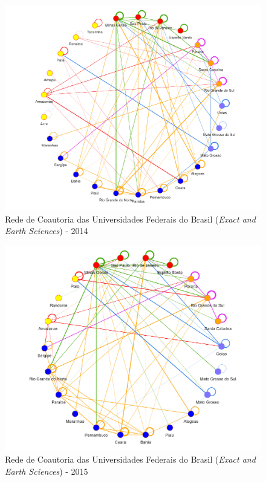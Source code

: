 \begin{figure}[H]
	\centering
	\includegraphics[scale=0.6]{Imagens/rede-exact-br-2014.pdf}
	\caption{Rede de Coautoria das Universidades Federais do Brasil (\textit{Exact and Earth Sciences}) - 2014}
	\label{Rede de Coautoria - UF EXACT BR 2014}
\end{figure}


\begin{figure}[H]
	\centering
	\includegraphics[scale=0.6]{Imagens/rede-exact-br-2015.pdf}
	\caption{Rede de Coautoria das Universidades Federais do Brasil (\textit{Exact and Earth Sciences}) - 2015}
	\label{Rede de Coautoria - UF EXACT BR 2015}
\end{figure}

